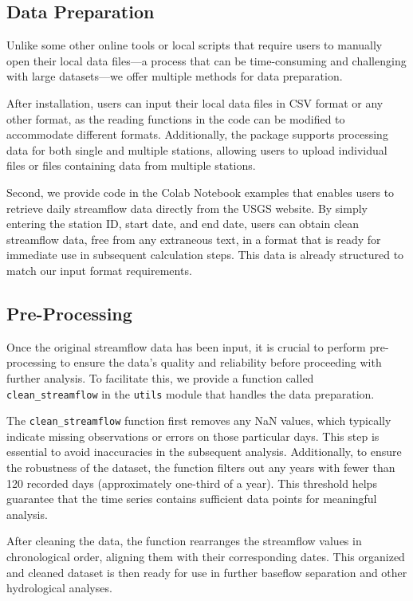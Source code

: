 \documentclass[hydrology,article,submit,pdftex,moreauthors]{Definitions/mdpi}
\begin{document}
\subsection{Data Preparation}
\label{sec:data_preparation}

Unlike some other online tools or local scripts that require users to manually open their local data files---a process that can be time-consuming and challenging with large datasets---we offer multiple methods for data preparation.

After installation, users can input their local data files in CSV format or any other format, as the reading functions in the code can be modified to accommodate different formats. Additionally, the package supports processing data for both single and multiple stations, allowing users to upload individual files or files containing data from multiple stations.

Second, we provide code in the Colab Notebook examples that enables users to retrieve daily streamflow data directly from the USGS website. By simply entering the station ID, start date, and end date, users can obtain clean streamflow data, free from any extraneous text, in a format that is ready for immediate use in subsequent calculation steps. This data is already structured to match our input format requirements.

\subsection{Pre-Processing}
\label{sec:preprocessing}

Once the original streamflow data has been input, it is crucial to perform pre-processing to ensure the data's quality and reliability before proceeding with further analysis. To facilitate this, we provide a function called \texttt{clean\_streamflow} in the \texttt{utils} module that handles the data preparation.

The \texttt{clean\_streamflow} function first removes any NaN values, which typically indicate missing observations or errors on those particular days. This step is essential to avoid inaccuracies in the subsequent analysis. Additionally, to ensure the robustness of the dataset, the function filters out any years with fewer than 120 recorded days (approximately one-third of a year). This threshold helps guarantee that the time series contains sufficient data points for meaningful analysis.

After cleaning the data, the function rearranges the streamflow values in chronological order, aligning them with their corresponding dates. This organized and cleaned dataset is then ready for use in further baseflow separation and other hydrological analyses.
\end{document}
